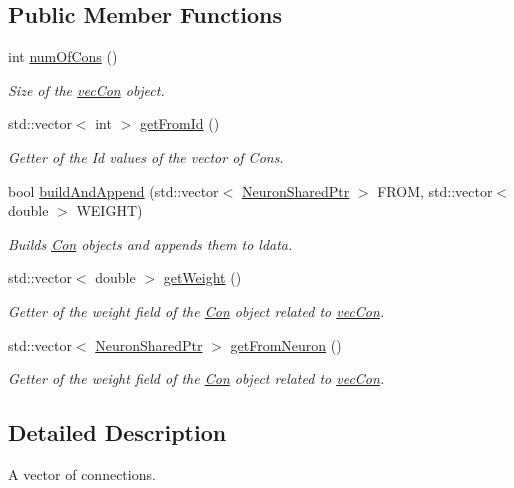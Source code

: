 \subsection*{Public Member Functions}
\begin{DoxyCompactItemize}
\item 
int \hyperlink{classvec_con_a1e39a5e78c40ae8af9bbd2fd7f0dc749}{numOfCons} ()
\begin{DoxyCompactList}\small\item\em Size of the \hyperlink{classvec_con}{vecCon} object. \end{DoxyCompactList}\item 
std::vector$<$ int $>$ \hyperlink{classvec_con_aa9f3f5df4c4060951c975c4c829b8471}{getFromId} ()
\begin{DoxyCompactList}\small\item\em Getter of the Id values of the vector of Cons. \end{DoxyCompactList}\item 
bool \hyperlink{classvec_con_ae53dc9d379d1544cb441d316c5d15ecd}{buildAndAppend} (std::vector$<$ \hyperlink{_a_m_o_r_e_8h_a03051950b0faf9499d14cf376e04c329}{NeuronSharedPtr} $>$ FROM, std::vector$<$ double $>$ WEIGHT)
\begin{DoxyCompactList}\small\item\em Builds \hyperlink{class_con}{Con} objects and appends them to ldata. \end{DoxyCompactList}\item 
std::vector$<$ double $>$ \hyperlink{classvec_con_a76f10669494f2247d036ae6a1f296873}{getWeight} ()
\begin{DoxyCompactList}\small\item\em Getter of the weight field of the \hyperlink{class_con}{Con} object related to \hyperlink{classvec_con}{vecCon}. \end{DoxyCompactList}\item 
std::vector$<$ \hyperlink{_a_m_o_r_e_8h_a03051950b0faf9499d14cf376e04c329}{NeuronSharedPtr} $>$ \hyperlink{classvec_con_ae72d00aedcd054e690f1dcf2ca5ac2c2}{getFromNeuron} ()
\begin{DoxyCompactList}\small\item\em Getter of the weight field of the \hyperlink{class_con}{Con} object related to \hyperlink{classvec_con}{vecCon}. \end{DoxyCompactList}\end{DoxyCompactItemize}


\subsection{Detailed Description}
A vector of connections. 

